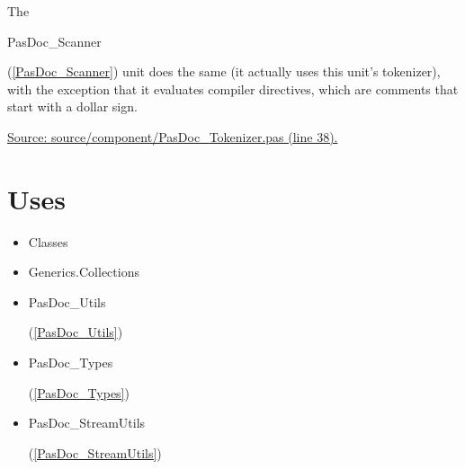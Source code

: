 \documentclass{report}
\begin{document}
The \begin{ttfamily}PasDoc{\_}Scanner\end{ttfamily}(\ref{PasDoc_Scanner}) unit does the same (it actually uses this unit's tokenizer), with the exception that it evaluates compiler directives, which are comments that start with a dollar sign.\par
\href{https://github.com/pasdoc/pasdoc/blob/master/source/component/PasDoc_Tokenizer.pas#L38}{Source: source/component/PasDoc{\_}Tokenizer.pas (line 38).}
\section{Uses}
\begin{itemize}
\item \begin{ttfamily}Classes\end{ttfamily}\item \begin{ttfamily}Generics.Collections\end{ttfamily}\item \begin{ttfamily}PasDoc{\_}Utils\end{ttfamily}(\ref{PasDoc_Utils})\item \begin{ttfamily}PasDoc{\_}Types\end{ttfamily}(\ref{PasDoc_Types})\item \begin{ttfamily}PasDoc{\_}StreamUtils\end{ttfamily}(\ref{PasDoc_StreamUtils})\end{itemize}
\end{document}

